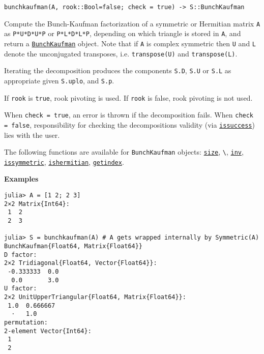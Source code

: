 \begin{adjustwidth}{2em}{0pt}


\begin{verbatim}
bunchkaufman(A, rook::Bool=false; check = true) -> S::BunchKaufman
\end{verbatim}

Compute the Bunch-Kaufman \footnotemark[3] factorization of a symmetric or Hermitian matrix \texttt{A} as \texttt{P{\textquotesingle}*U*D*U{\textquotesingle}*P} or \texttt{P{\textquotesingle}*L*D*L{\textquotesingle}*P}, depending on which triangle is stored in \texttt{A}, and return a \hyperlink{10272627787201613275}{\texttt{BunchKaufman}} object. Note that if \texttt{A} is complex symmetric then \texttt{U{\textquotesingle}} and \texttt{L{\textquotesingle}} denote the unconjugated transposes, i.e. \texttt{transpose(U)} and \texttt{transpose(L)}.

Iterating the decomposition produces the components \texttt{S.D}, \texttt{S.U} or \texttt{S.L} as appropriate given \texttt{S.uplo}, and \texttt{S.p}.

If \texttt{rook} is \texttt{true}, rook pivoting is used. If \texttt{rook} is false, rook pivoting is not used.

When \texttt{check = true}, an error is thrown if the decomposition fails. When \texttt{check = false}, responsibility for checking the decomposition{\textquotesingle}s validity (via \hyperlink{10694198281534172656}{\texttt{issuccess}}) lies with the user.

The following functions are available for \texttt{BunchKaufman} objects: \hyperlink{17888996102305087038}{\texttt{size}}, \texttt{{\textbackslash}}, \hyperlink{13336866048543706848}{\texttt{inv}}, \hyperlink{2326080217547608316}{\texttt{issymmetric}}, \hyperlink{2319981190929881860}{\texttt{ishermitian}}, \hyperlink{13720608614876840481}{\texttt{getindex}}.

\textbf{Examples}


\begin{verbatim}
julia> A = [1 2; 2 3]
2×2 Matrix{Int64}:
 1  2
 2  3

julia> S = bunchkaufman(A) # A gets wrapped internally by Symmetric(A)
BunchKaufman{Float64, Matrix{Float64}}
D factor:
2×2 Tridiagonal{Float64, Vector{Float64}}:
 -0.333333  0.0
  0.0       3.0
U factor:
2×2 UnitUpperTriangular{Float64, Matrix{Float64}}:
 1.0  0.666667
  ⋅   1.0
permutation:
2-element Vector{Int64}:
 1
 2


\end{verbatim}
\end{adjustwidth}
